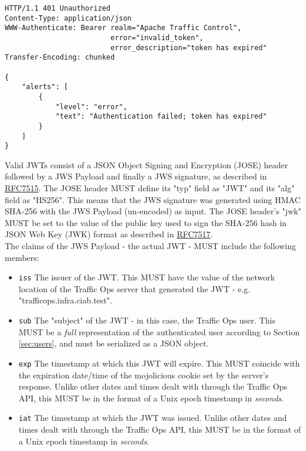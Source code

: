 \documentclass{article}
\newenvironment{codelisting}{\captionsetup{type=listing}}{}
\newcommand{\code}[1]{\texttt{\color{inlinecodecolor}#1}}
\begin{document}
\begin{codelisting}
\label{code:expired-token}
\begin{verbatim}
HTTP/1.1 401 Unauthorized
Content-Type: application/json
WWW-Authenticate: Bearer realm="Apache Traffic Control",
                         error="invalid_token",
                         error_description="token has expired"
Transfer-Encoding: chunked

{
	"alerts": [
		{
			"level": "error",
			"text": "Authentication failed; token has expired"
		}
	]
}
\end{verbatim}
\end{codelisting}

Valid JWTs consist of a JSON Object Signing and Encryption (JOSE) header followed by a JWS Payload and finally a JWS signature, as described
in \href{https://tools.ietf.org/html/rfc7515}{RFC7515}. The JOSE header MUST define its "typ" field as "JWT" and its "alg" field as "HS256".
This means that the JWS signature was generated using HMAC SHA-256 with the JWS Payload (un-encoded) as input. The JOSE header's "jwk" MUST be
set to the value of the public key used to sign the SHA-256 hash in JSON Web Key (JWK) format as described in
\href{https://tools.ietf.org/html/rfc7517}{RFC7517}.\\
The claims of the JWS Payload - the actual JWT - MUST include the following members:

\begin{itemize}
	\item \code{iss} The issuer of the JWT. This MUST have the value of the network location of the Traffic Ops server that
	generated the JWT - e.g. "trafficops.infra.ciab.test".
	\item \code{sub} The "subject" of the JWT - in this case, the Traffic Ops user. This MUST be a \emph{full} representation of the
	authenticated user according to Section \ref{sec:users}, and must be serialized as a JSON object.
	\item \code{exp} The timestamp at which this JWT will expire. This MUST coincide with the expiration date/time of the mojolicious
	cookie set by the server's response. Unlike other dates and times dealt with through the Traffic Ops API, this MUST be in the format of
	a Unix epoch timestamp in \emph{seconds}.
	\item \code{iat} The timestamp at which the JWT was issued. Unlike other dates and times dealt with through the Traffic Ops API, this
	MUST be in the format of a Unix epoch timestamp in \emph{seconds}.
\end{itemize}
\end{document}
